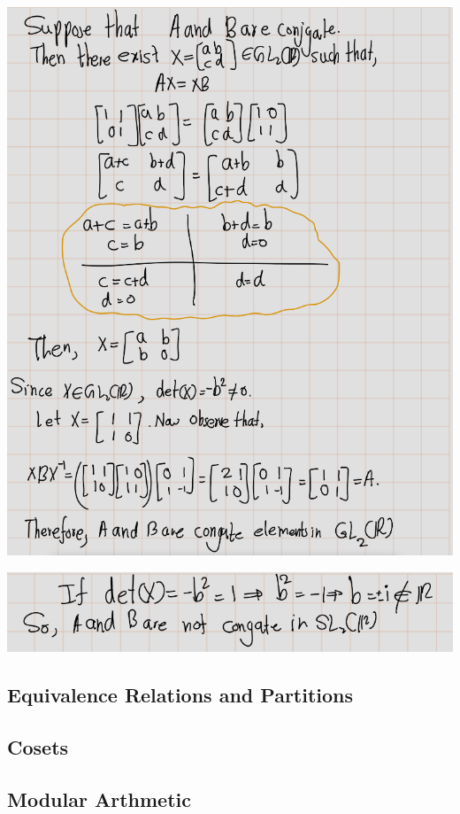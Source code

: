\documentclass[
]{book}
\theoremstyle{definition}
\theoremstyle{definition}
\theoremstyle{definition}
\theoremstyle{definition}
\theoremstyle{remark}
\begin{document}
\includegraphics{figures/ch_2/fig85.png}

\includegraphics{figures/ch_2/fig86.png}

\hypertarget{equivalence-relations-and-partitions-1}{%
\subsection{Equivalence Relations and Partitions}\label{equivalence-relations-and-partitions-1}}

\hypertarget{cosets-1}{%
\subsection{Cosets}\label{cosets-1}}

\hypertarget{modular-arthmetic}{%
\subsection{Modular Arthmetic}\label{modular-arthmetic}}
\end{document}
